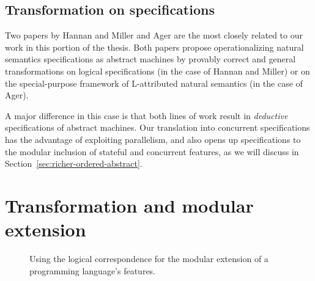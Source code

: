 \subsection{Transformation on specifications}

Two papers by Hannan and Miller \cite{hannan92operational} and Ager
\cite{ager04natural} are the most closely related to our work in this
portion of the thesis. Both papers propose operationalizing natural
semantics specifications as abstract machines by provably correct and
general transformations on logical specifications (in the case of
Hannan and Miller) or on the special-purpose framework of L-attributed
natural semantics (in the case of Ager).

A major difference in this case is that both lines of
work result in {\it deductive} specifications of abstract
machines. Our translation into concurrent specifications has the
advantage of exploiting parallelism, and also opens up specifications to
the modular inclusion of stateful and concurrent features, as we will
discuss in Section~\ref{sec:richer-ordered-abstract}.


\section{Transformation and modular extension}

\begin{figure}
\begin{center}
\end{center}
\caption{Using the logical correspondence for the modular extension of
  a programming language's features.}
\label{fig:modularcompose}
\end{figure}

